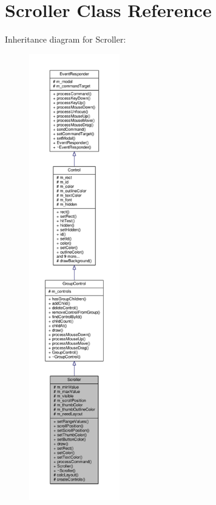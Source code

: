 \hypertarget{classScroller}{}\section{Scroller Class Reference}
\label{classScroller}


Inheritance diagram for Scroller\+:
\nopagebreak
\begin{figure}[H]
\begin{center}
\leavevmode
\includegraphics[height=550pt]{da/d9d/classScroller__inherit__graph}
\end{center}
\end{figure}


